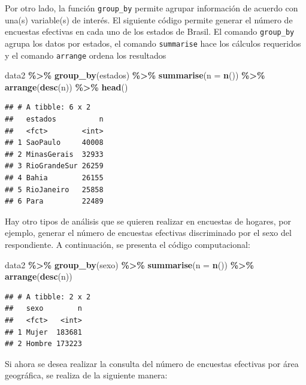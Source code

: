 \documentclass[
  spanish,
  12pt,
]{book}
\newenvironment{Shaded}{\begin{snugshade}}{\end{snugshade}}
\newcommand{\AttributeTok}[1]{\textcolor[rgb]{0.13,0.29,0.53}{#1}}
\newcommand{\FunctionTok}[1]{\textcolor[rgb]{0.13,0.29,0.53}{\textbf{#1}}}
\newcommand{\NormalTok}[1]{#1}
\newcommand{\SpecialCharTok}[1]{\textcolor[rgb]{0.81,0.36,0.00}{\textbf{#1}}}
\begin{document}
Por otro lado, la función \texttt{group\_by} permite agrupar información de acuerdo con una(s) variable(s) de interés. El siguiente código permite generar el número de encuestas efectivas en cada uno de los estados de Brasil. El comando \texttt{group\_by} agrupa los datos por estados, el comando \texttt{summarise} hace los cálculos requeridos y el comando \texttt{arrange} ordena los resultados

\begin{Shaded}
\begin{Highlighting}[]
\NormalTok{data2 }\SpecialCharTok{\%\textgreater{}\%} 
  \FunctionTok{group\_by}\NormalTok{(estados) }\SpecialCharTok{\%\textgreater{}\%} 
  \FunctionTok{summarise}\NormalTok{(}\AttributeTok{n =} \FunctionTok{n}\NormalTok{()) }\SpecialCharTok{\%\textgreater{}\%} \FunctionTok{arrange}\NormalTok{(}\FunctionTok{desc}\NormalTok{(n)) }\SpecialCharTok{\%\textgreater{}\%} \FunctionTok{head}\NormalTok{()}
\end{Highlighting}
\end{Shaded}

\begin{verbatim}
## # A tibble: 6 x 2
##   estados          n
##   <fct>        <int>
## 1 SaoPaulo     40008
## 2 MinasGerais  32933
## 3 RioGrandeSur 26259
## 4 Bahia        26155
## 5 RioJaneiro   25858
## 6 Para         22489
\end{verbatim}

Hay otro tipos de análisis que se quieren realizar en encuestas de hogares, por ejemplo, generar el número de encuestas efectivas discriminado por el sexo del respondiente. A continuación, se presenta el código computacional:

\begin{Shaded}
\begin{Highlighting}[]
\NormalTok{data2 }\SpecialCharTok{\%\textgreater{}\%} 
  \FunctionTok{group\_by}\NormalTok{(sexo) }\SpecialCharTok{\%\textgreater{}\%} 
  \FunctionTok{summarise}\NormalTok{(}\AttributeTok{n =} \FunctionTok{n}\NormalTok{()) }\SpecialCharTok{\%\textgreater{}\%} \FunctionTok{arrange}\NormalTok{(}\FunctionTok{desc}\NormalTok{(n)) }
\end{Highlighting}
\end{Shaded}

\begin{verbatim}
## # A tibble: 2 x 2
##   sexo        n
##   <fct>   <int>
## 1 Mujer  183681
## 2 Hombre 173223
\end{verbatim}

Si ahora se desea realizar la consulta del número de encuestas efectivas por área geográfica, se realiza de la siguiente manera:
\end{document}
